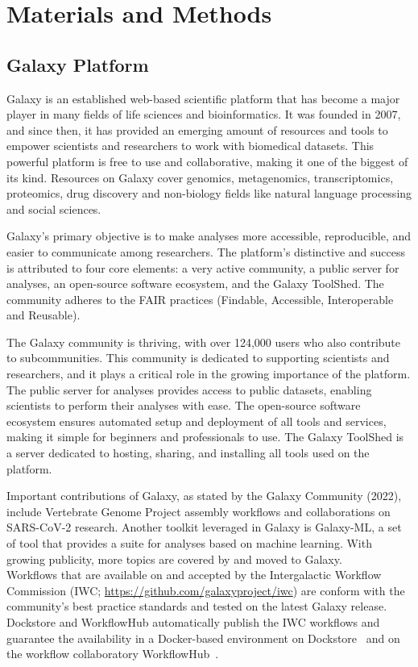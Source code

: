 \chapter{Materials and Methods}\label{chap:methods}

\section{Galaxy Platform}\label{sec:galaxy}
Galaxy is an established web-based scientific platform that has become a major player in many fields of life sciences and bioinformatics. It was founded in 2007, and since then, it has provided an emerging amount of resources and tools to empower scientists and researchers to work with biomedical datasets. This powerful platform is free to use and collaborative, making it one of the biggest of its kind. Resources on Galaxy cover genomics, metagenomics, transcriptomics, proteomics, drug discovery and non-biology fields like natural language processing and social sciences.

Galaxy's primary objective is to make analyses more accessible, reproducible, and easier to communicate among researchers. The platform's distinctive and success is attributed to four core elements: a very active community, a public server for analyses, an open-source software ecosystem, and the Galaxy ToolShed. The community adheres to the FAIR practices (Findable, Accessible, Interoperable and Reusable).

The Galaxy community is thriving, with over 124,000 users who also contribute to subcommunities. This community is dedicated to supporting scientists and researchers, and it plays a critical role in the growing importance of the platform. The public server for analyses provides access to public datasets, enabling scientists to perform their analyses with ease. The open-source software ecosystem ensures automated setup and deployment of all tools and services, making it simple for beginners and professionals to use. The Galaxy ToolShed is a server dedicated to hosting, sharing, and installing all tools used on the platform.

Important contributions of Galaxy, as stated by the Galaxy Community (2022), include Vertebrate Genome Project assembly workflows and collaborations on SARS-CoV-2 research. Another toolkit leveraged in Galaxy is Galaxy-ML, a set of tool that provides a suite for analyses based on machine learning. With growing publicity, more topics are covered by and moved to Galaxy. \\Workflows that are available on and accepted by the Intergalactic Workflow Commission (IWC; \url{https://github.com/galaxyproject/iwc}) are conform with the community's best practice standards and tested on the latest Galaxy release. Dockstore and WorkflowHub automatically publish the IWC workflows and guarantee the availability in a Docker-based environment on Dockstore~\cite{o2017dockstore} and on the workflow collaboratory WorkflowHub~\cite{goble2021implementing}.


